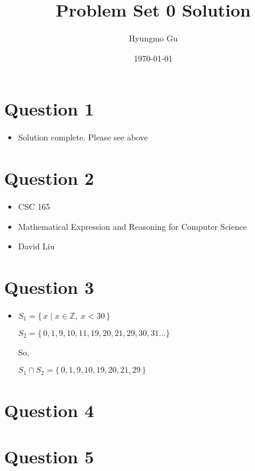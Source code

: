 \documentclass[12pt]{article}
\begin{document}
\title{Problem Set 0 Solution}
\author{Hyungmo Gu}
\date{\today}
\maketitle

\section*{Question 1}
    \begin{itemize}
        \item Solution complete. Please see above
    \end{itemize}

\section*{Question 2}
    \begin{itemize}
        \item CSC 165
        \item Mathematical Expression and Reasoning for Computer Science
        \item David Liu
    \end{itemize}

\section*{Question 3}
    \begin{itemize}
        \item
            $S_1 = \{\,x \mid x \in \mathbb{Z},\:x < 30\,\}$

            $S_2 = \{\,0, 1, 9, 10, 11, 19, 20, 21, 29, 30, 31 \dotsc\}$

            So,

            $S_1 \cap S_2 = \{\,0, 1, 9, 10, 19, 20, 21, 29\,\}$


    \end{itemize}


\section*{Question 4}

\section*{Question 5}
\end{document}
